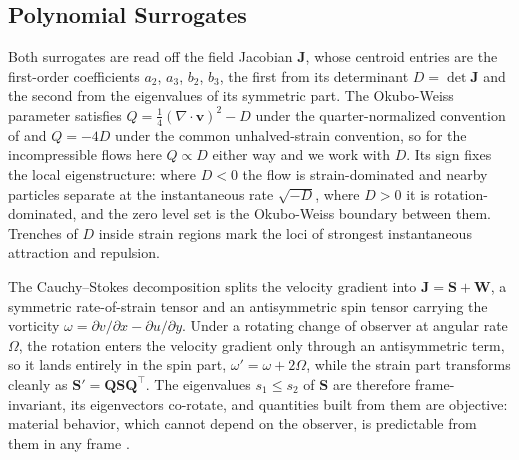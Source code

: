 \documentclass[lettersize,journal]{IEEEtran}
\begin{document}
\subsection{Polynomial Surrogates}
\label{sec:surrogates}
\label{sec:strain_field}

Both surrogates are read off the field Jacobian $\mathbf{J}$, whose
centroid entries are the first-order coefficients $a_2$, $a_3$, $b_2$,
$b_3$, the first from its determinant $D = \det \mathbf{J}$ and the
second from the eigenvalues of its symmetric part. The Okubo-Weiss
parameter \cite{21,22} satisfies $Q = \tfrac{1}{4} (\nabla \cdot
\mathbf{v})^2 - D$ under the quarter-normalized convention of
\cite{24} and $Q = -4D$ under the common unhalved-strain convention, so
for the incompressible flows here $Q \propto D$ either way and we work
with $D$. Its sign fixes the local eigenstructure: where $D < 0$ the
flow is strain-dominated and nearby particles separate at the
instantaneous rate $\sqrt{-D}$, where $D > 0$ it is rotation-dominated,
and the zero level set is the Okubo-Weiss boundary between them.
Trenches of $D$ inside strain regions mark the loci of strongest
instantaneous attraction and repulsion.

The Cauchy--Stokes decomposition splits the velocity gradient into
$\mathbf{J} = \mathbf{S} + \mathbf{W}$, a symmetric rate-of-strain
tensor and an antisymmetric spin tensor carrying the vorticity $\omega
= \partial v/\partial x - \partial u/\partial y$. Under a rotating
change of observer at angular rate $\Omega$, the rotation enters the
velocity gradient only through an antisymmetric term, so it lands
entirely in the spin part, $\omega' = \omega + 2\Omega$, while the
strain part transforms cleanly as $\mathbf{S}' = \mathbf{Q}\mathbf{S}
\mathbf{Q}^\top$. The eigenvalues $s_1 \leq s_2$ of $\mathbf{S}$ are
therefore frame-invariant, its eigenvectors co-rotate, and quantities
built from them are objective: material behavior, which cannot depend
on the observer, is predictable from them in any frame \cite{16,17}.
\end{document}
